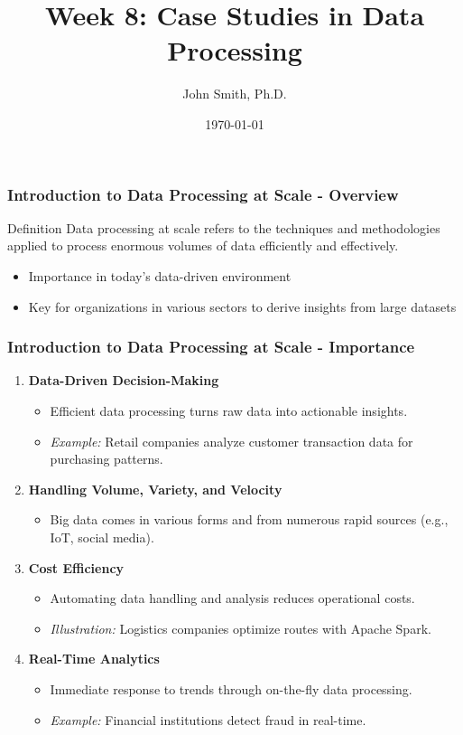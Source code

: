 \documentclass[aspectratio=169]{beamer}
\title{Week 8: Case Studies in Data Processing}
\author[J. Smith]{John Smith, Ph.D.}
\institute[University Name]{Department of Computer Science\\University Name}
\date{\today}
\begin{document}
\frame{\titlepage}

\begin{frame}[fragile]
    \frametitle{Introduction to Data Processing at Scale - Overview}
    \begin{block}{Definition}
        Data processing at scale refers to the techniques and methodologies applied to process enormous volumes of data efficiently and effectively.
    \end{block}
    
    \begin{itemize}
        \item Importance in today's data-driven environment
        \item Key for organizations in various sectors to derive insights from large datasets
    \end{itemize}
\end{frame}

\begin{frame}[fragile]
    \frametitle{Introduction to Data Processing at Scale - Importance}
    \begin{enumerate}
        \item \textbf{Data-Driven Decision-Making}
            \begin{itemize}
                \item Efficient data processing turns raw data into actionable insights.
                \item \textit{Example:} Retail companies analyze customer transaction data for purchasing patterns.
            \end{itemize}
        
        \item \textbf{Handling Volume, Variety, and Velocity}
            \begin{itemize}
                \item Big data comes in various forms and from numerous rapid sources (e.g., IoT, social media).
            \end{itemize}
        
        \item \textbf{Cost Efficiency}
            \begin{itemize}
                \item Automating data handling and analysis reduces operational costs.
                \item \textit{Illustration:} Logistics companies optimize routes with Apache Spark.
            \end{itemize}
            
        \item \textbf{Real-Time Analytics}
            \begin{itemize}
                \item Immediate response to trends through on-the-fly data processing.
                \item \textit{Example:} Financial institutions detect fraud in real-time.
            \end{itemize}
    \end{enumerate}
\end{frame}
\end{document}
